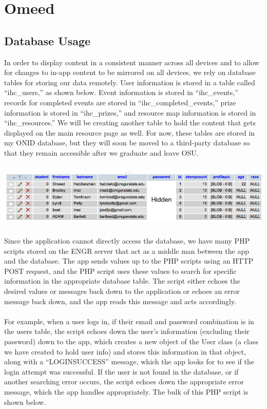 \documentclass[onecolumn, draftclsnofoot,10pt, compsoc]{IEEEtran}
\begin{document}
\newpage
\section{Omeed}
	\subsection{Database Usage}
		In order to display content in a consistent manner across all devices and to allow for changes to in-app content to be mirrored on all devices, we rely on database tables for storing our data remotely. User information is stored in a table called “ihc\_users,” as shown below. Event information is stored in “ihc\_events,” records for completed events are stored in “ihc\_completed\_events,” prize information is stored in “ihc\_prizes,” and resource map information is stored in “ihc\_resources.” We will be creating another table to hold the content that gets displayed on the main resource page as well. For now, these tables are stored in my ONID database, but they will soon be moved to a third-party database so that they remain accessible after we graduate and leave OSU. \\ \\

		\includegraphics[height=3cm]{ihcusersdb}

		Since the application cannot directly access the database, we have many PHP scripts stored on the ENGR server that act as a middle man between the app and the database. The app sends values up to the PHP scripts using an HTTP POST request, and the PHP script uses these values to search for specific information in the appropriate database table. The script either echoes the desired values or messages back down to the application or echoes an error message back down, and the app reads this message and acts accordingly. \\ \\
		For example, when a user logs in, if their email and password combination is in the users table, the script echoes down the user’s information (excluding their password) down to the app, which creates a new object of the User class (a class we have created to hold user info) and stores this information in that object, along with a “LOGINSUCCESS” message, which the app looks for to see if the login attempt was successful. If the user is not found in the database, or if another searching error occurs, the script echoes down the appropriate error message, which the app handles appropriately. The bulk of this PHP script is shown below.
		\newpage
\end{document}

